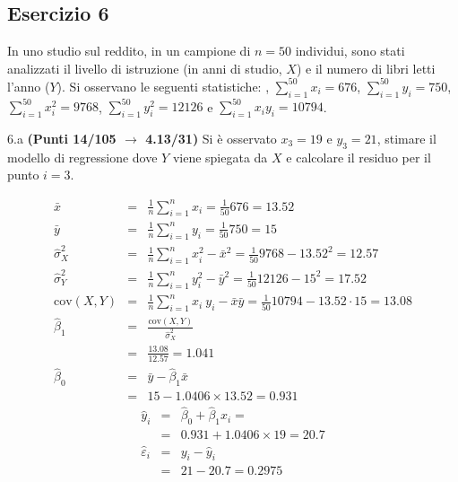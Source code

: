 \documentclass[
  11pt,
]{book}
\theoremstyle{mytheoremstyle}
\theoremstyle{mydefstyle}
\newenvironment{sol}
  {
  \begin{tcolorbox}[enhanced,breakable,arc=0.1mm,boxrule=1pt,colback=white,colframe=iblue,
  title=\bf \fontfamily{lmss}\selectfont \hspace{.5 cm} Soluzione,drop fuzzy shadow]

}{
\end{tcolorbox}
  }
\begin{document}
\subsection{Esercizio 6}\label{esercizio-6-31}

In uno studio sul reddito, in un campione di \(n=50\) individui, sono stati analizzati il livello di istruzione (in anni di studio, \(X\)) e il numero di libri letti l'anno (\(Y\)).
Si osservano le seguenti statistiche:
, \(\sum_{i=1}^{50}x_i=676\), \(\sum_{i=1}^{50}y_i=750\),
\(\sum_{i=1}^{50}x_i^2=9768\), \(\sum_{i=1}^{50}y_i^2=12126\) e \(\sum_{i=1}^{50}x_iy_i=10794\).

6.a \textbf{(Punti 14/105 \(\rightarrow\) 4.13/31)} Si è osservato \(x_3=19\) e \(y_3=21\), stimare il modello di regressione dove \(Y\) viene spiegata da \(X\) e calcolare il residuo per il punto \(i=3\).

\begin{sol}
\begin{eqnarray*}
           \bar x &=&\frac 1 n\sum_{i=1}^n x_i = \frac {1}{ 50 }  676 =  13.52 \\
           \bar y &=&\frac 1 n\sum_{i=1}^n y_i = \frac {1}{ 50 }  750 =  15 \\
           \hat\sigma_X^2&=&\frac 1 n\sum_{i=1}^n x_i^2-\bar x^2=\frac {1}{ 50 }  9768  - 13.52 ^2= 12.57 \\
           \hat\sigma_Y^2&=&\frac 1 n\sum_{i=1}^n y_i^2-\bar y^2=\frac {1}{ 50 }  12126  - 15 ^2= 17.52 \\
           \text{cov}(X,Y)&=&\frac 1 n\sum_{i=1}^n x_i~y_i-\bar x\bar y=\frac {1}{ 50 }  10794 - 13.52 \cdot 15 = 13.08 \\
           \hat\beta_1 &=& \frac{\text{cov}(X,Y)}{\hat\sigma_X^2} \\
                    &=& \frac{ 13.08 }{ 12.57 }  =  1.041 \\
           \hat\beta_0 &=& \bar y - \hat\beta_1 \bar x\\
                    &=&  15 - 1.0406 \times  13.52 = 0.931 
         \end{eqnarray*}\begin{eqnarray*}
\hat y_i &=&\hat\beta_0+\hat\beta_1 x_i=\\ 
&=& 0.931 + 1.0406 \times 19 = 20.7 \\ 
\hat \varepsilon_i &=& y_i-\hat y_i\\ 
&=& 21 - 20.7 = 0.2975  
\end{eqnarray*}

\end{sol}
\end{document}

